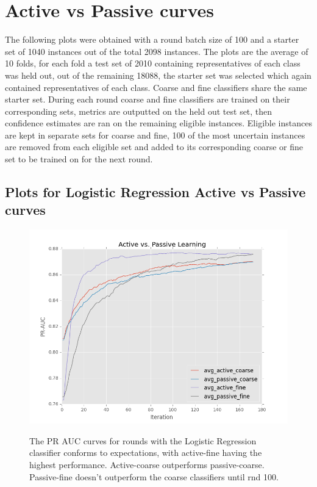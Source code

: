 \documentclass[ms]{nuthesis}
\begin{document}
\section{Active vs Passive curves}
\par The following plots were obtained with a round batch size of 100
and a starter set of 1040 instances out of the total 2098 instances.
The plots are the average of 10 folds, for each fold a test set of 2010
containing representatives of each class was held out, out of the remaining
18088, the starter set was selected which again contained representatives of
each class. Coarse and fine classifiers share the same starter set. During
 each round coarse and fine classifiers are trained on their corresponding
 sets, metrics are outputted on the held out test set, then confidence estimates
 are ran on the remaining eligible instances. Eligible instances are kept in
 separate sets for coarse and fine, 100 of the most uncertain instances are removed
 from each eligible set and added to its corresponding coarse or fine set to be
 trained on for the next round.


\FloatBarrier
\subsection{Plots for Logistic Regression Active vs Passive curves}
\begin{figure}[!htb]
	\centering
    \includegraphics[width=1.0\columnwidth]{fig/ActiveVsPassivePRLR}
    \label{fig:ActiveVsPassivePRLR}
    \caption{The PR AUC curves for rounds with the Logistic
Regression classifier conforms to expectations, with active-fine having
the highest performance. Active-coarse outperforms passive-coarse. Passive-fine
doesn't outperform the coarse classifiers until rnd 100. }
\end{figure}
\FloatBarrier
\end{document}
